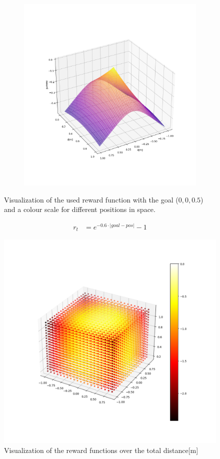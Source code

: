 \begin{figure}
\begin{subfigure}{0.3\linewidth}
		\caption{}
	\end{subfigure}
	\begin{subfigure}{0.3\linewidth}
		\includegraphics[width=\linewidth]{figures/rewXZ.png}
		\caption{}
	\end{subfigure}
	\caption{Visualization of the used reward function with the goal ($0,0,0.5$) and a colour scale for different positions in space.}
\end{figure}

\begin{align}
	r_t &= e^{-0.6 \cdot |goal - pos|} - 1 \label{eq:rew}
\end{align}

\newpage

\begin{figure}
	\centering
	\includegraphics[width= 0.5\linewidth]{figures/reward.png}
	\caption{Visualization of the reward functions over the total distance[m]}
\end{figure}

